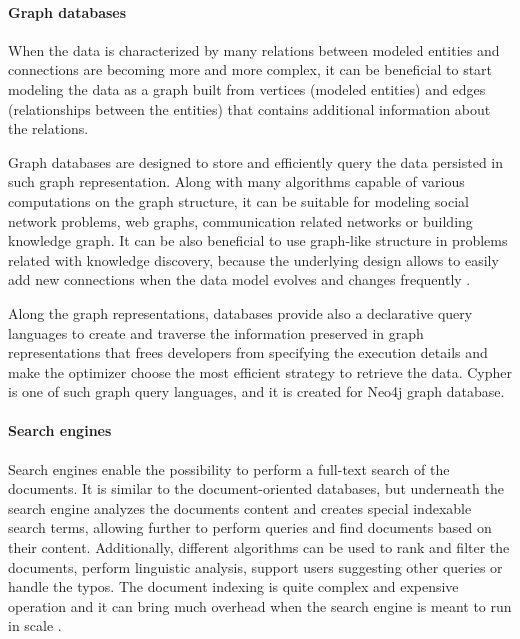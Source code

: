 \paragraph{Graph databases}

When the data is characterized by many relations between modeled entities and connections are becoming more and more complex, it can be beneficial to start modeling the data as a graph built from vertices (modeled entities) and edges (relationships between the entities) that contains additional information about the relations. 

Graph databases are designed to store and efficiently query the data persisted in such graph representation. Along with many algorithms capable of various computations on the graph structure, it can be suitable for modeling social network problems, web graphs, communication related networks or building knowledge graph. It can be also beneficial to use graph-like structure in problems related with knowledge discovery, because the underlying design allows to easily add new connections when the data model evolves and changes frequently \cite{DesignDataIntensiveApplications}.

Along the graph representations, databases provide also a declarative query languages to create and traverse the information preserved in graph representations that frees developers from specifying the execution details and make the optimizer choose the most efficient strategy to retrieve the data. Cypher is one of such graph query languages, and it is created for Neo4j \cite{Neo4j} graph database.

\paragraph{Search engines}

Search engines enable the possibility to perform a full-text search of the documents. It is similar to the document-oriented databases, but underneath the search engine analyzes the documents content and creates special indexable search terms, allowing further to perform queries and find documents based on their content. Additionally, different algorithms can be used to rank and filter the documents, perform linguistic analysis, support users suggesting other queries or handle the typos. The document indexing is quite complex and expensive operation and it can bring much overhead when the search engine is meant to run in scale \cite{DesignDataIntensiveApplications}. 

